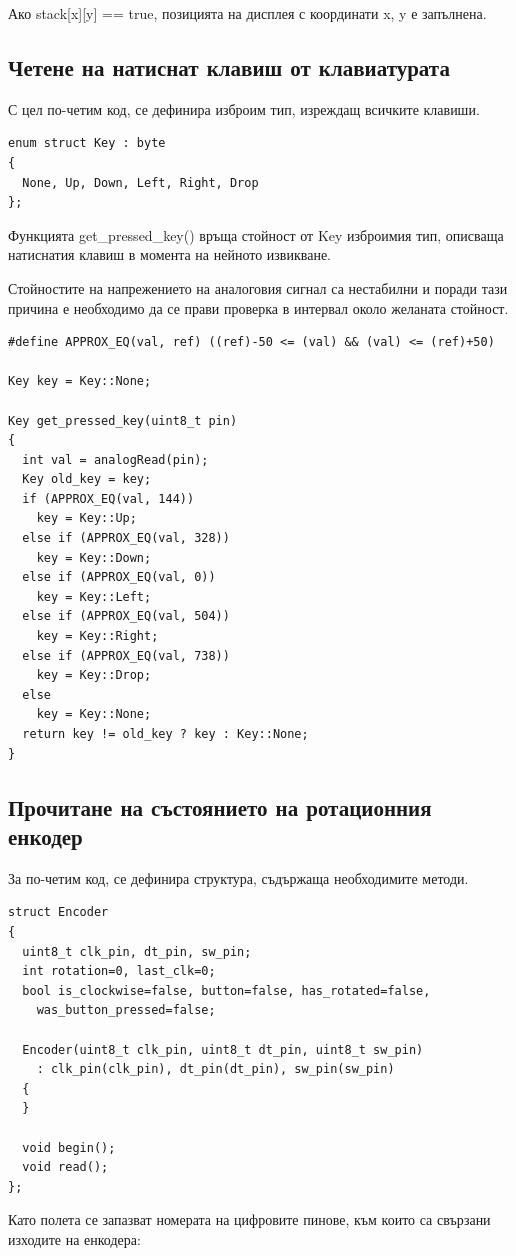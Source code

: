 \documentclass[titlepage, oneside, 14pt]{extbook}
\renewcommand{\texttt}[1]{{\small\ttfamily #1}}
\begin{document}
Ако \texttt{stack[x][y] == true}, позицията на дисплея с координати \texttt{x}, \texttt{y} е запълнена.

\subsection{Четене на натиснат клавиш от клавиатурата}

С цел по-четим код, се дефинира изброим тип, изреждащ всичките клавиши.

\begin{verbatim}
enum struct Key : byte
{
  None, Up, Down, Left, Right, Drop
};
\end{verbatim}

Функцията \texttt{get_pressed_key()} връща стойност от \texttt{Key} изброимия
тип, описваща натиснатия клавиш в момента на нейното извикване.

Стойностите на напрежението на аналоговия сигнал са нестабилни и поради тази причина е необходимо
да се прави проверка в интервал около желаната стойност.

\begin{verbatim}
#define APPROX_EQ(val, ref) ((ref)-50 <= (val) && (val) <= (ref)+50)

Key key = Key::None;

Key get_pressed_key(uint8_t pin)
{
  int val = analogRead(pin);
  Key old_key = key;
  if (APPROX_EQ(val, 144))
    key = Key::Up;
  else if (APPROX_EQ(val, 328))
    key = Key::Down;
  else if (APPROX_EQ(val, 0))
    key = Key::Left;
  else if (APPROX_EQ(val, 504))
    key = Key::Right;
  else if (APPROX_EQ(val, 738))
    key = Key::Drop;
  else
    key = Key::None;
  return key != old_key ? key : Key::None;
}
\end{verbatim}

\subsection{Прочитане на състоянието на ротационния енкодер}

За по-четим код, се дефинира структура, съдържаща необходимите методи.

\begin{verbatim}
struct Encoder
{
  uint8_t clk_pin, dt_pin, sw_pin;
  int rotation=0, last_clk=0;
  bool is_clockwise=false, button=false, has_rotated=false,
    was_button_pressed=false;

  Encoder(uint8_t clk_pin, uint8_t dt_pin, uint8_t sw_pin)
    : clk_pin(clk_pin), dt_pin(dt_pin), sw_pin(sw_pin)
  {
  }

  void begin();
  void read();
};

\end{verbatim}
Като полета се запазват номерата на цифровите пинове, към които са свързани изходите на енкодера:
\end{document}
